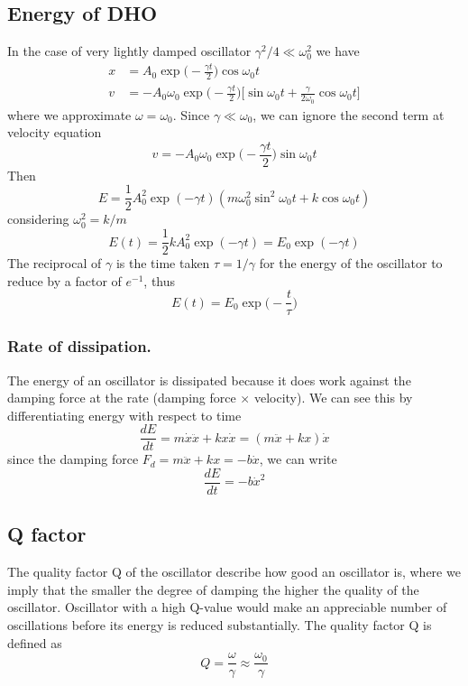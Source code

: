 \documentclass[../../../main.tex]{subfiles}
\begin{document}
\subsection*{Energy of DHO}
In the case of very lightly damped oscillator $\gamma^2/4\ll \omega_0^2$ we have
\begin{align*}
    x &= A_0\exp\biggl(-\frac{\gamma t}{2}\biggr)\cos\omega_0 t\\
    v&=-A_0\omega_0\exp\biggl(-\frac{\gamma t}{2}\biggr)\biggl[\sin\omega_0t +\frac{\gamma}{2\omega_0}\cos\omega_0 t\biggr]
\end{align*}
where we approximate $\omega=\omega_0$. Since $\gamma \ll \omega_0$, we can ignore the second term at velocity equation
\begin{equation*}
    v=-A_0\omega_0\exp\biggl(-\frac{\gamma t}{2}\biggr)\sin\omega_0t 
\end{equation*}
Then
\begin{equation*}
    E=\frac{1}{2}A_0^2 \exp(-\gamma t)(m\omega_0^2\sin^2\omega_0t+k\cos\omega_0t)
\end{equation*}
considering $\omega_0^2=k/m$
\begin{equation*}
   E(t)= \frac{1}{2}kA_0^2\exp(-\gamma t) =E_0\exp(-\gamma t) 
\end{equation*}
The reciprocal of $\gamma$ is the time taken $\tau=1/\gamma$ for the energy of the oscillator to reduce by a factor of $e^{-1}$, thus
\begin{equation*}
    E(t)=E_0\exp \biggl(-\frac{t}{\tau}\biggr)
\end{equation*}

\subsubsection*{Rate of dissipation.} The energy of an oscillator is dissipated because it does work against the damping force at the rate (damping force $\times$ velocity). We can see this by differentiating energy with respect to time
\begin{equation*}
    \frac{dE}{dt}=m\dot{x}\ddot{x}+kx\dot{x}=(m\ddot{x}+kx)\dot{x}
\end{equation*}
since the damping force $F_d=m\ddot{x}+kx=-b\dot{x}$, we can write
\begin{equation*}
    \frac{dE}{dt}=-b\dot{x}^2
\end{equation*}

\subsection*{Q factor}
The quality factor Q of the oscillator describe how good an oscillator is, where we imply that the smaller the degree of damping the higher the quality of the oscillator. Oscillator with a high Q-value would make an appreciable number of oscillations before its energy is reduced substantially. The quality factor Q is defined as
\begin{equation*}
    Q=\frac{\omega}{\gamma}\approx\frac{\omega_0}{\gamma}
\end{equation*}
\end{document}
